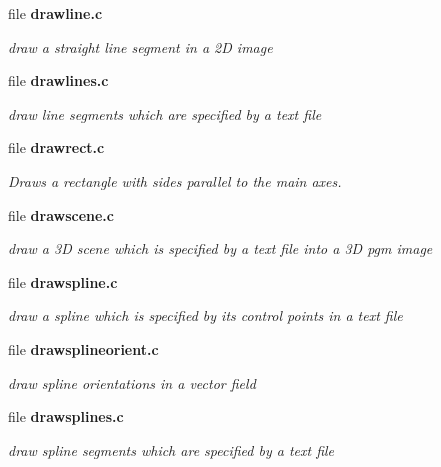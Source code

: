 \begin{CompactItemize}
\item 
file {\bf drawline.c}
\begin{CompactList}\small\item\em draw a straight line segment in a 2D image \item\end{CompactList}

\item 
file {\bf drawlines.c}
\begin{CompactList}\small\item\em draw line segments which are specified by a text file \item\end{CompactList}

\item 
file {\bf drawrect.c}
\begin{CompactList}\small\item\em Draws a rectangle with sides parallel to the main axes. \item\end{CompactList}

\item 
file {\bf drawscene.c}
\begin{CompactList}\small\item\em draw a 3D scene which is specified by a text file into a 3D pgm image \item\end{CompactList}

\item 
file {\bf drawspline.c}
\begin{CompactList}\small\item\em draw a spline which is specified by its control points in a text file \item\end{CompactList}

\item 
file {\bf drawsplineorient.c}
\begin{CompactList}\small\item\em draw spline orientations in a vector field \item\end{CompactList}

\item 
file {\bf drawsplines.c}
\begin{CompactList}\small\item\em draw spline segments which are specified by a text file \item\end{CompactList}


\end{CompactItemize}
